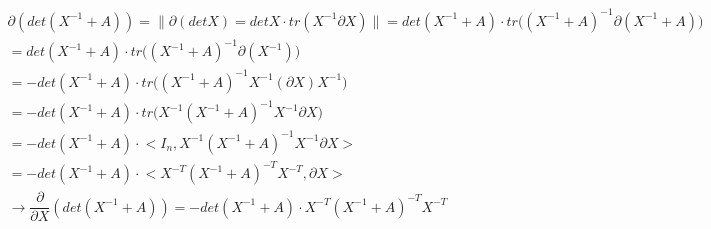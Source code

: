\begin{gather*}
\partial (det(X^{-1}+A)) = \bigg\| \partial(detX) = detX \cdot tr(X^{-1}\partial X) \bigg\| = det(X^{-1}+A) \cdot tr\big( (X^{-1}+A)^{-1}  \partial (X^{-1} + A) \big) \\ = det(X^{-1}+A) \cdot tr\big( (X^{-1}+A)^{-1}  \partial (X^{-1}) \big)
\\ = - det(X^{-1}+A) \cdot tr\big( (X^{-1}+A)^{-1}  X^{-1} (\partial X) X^{-1} \big)
\\ = - det(X^{-1}+A) \cdot tr\big( X^{-1} (X^{-1}+A)^{-1} X^{-1} \partial X \big)
\\ = - det(X^{-1}+A) \cdot \big<I_n, X^{-1} (X^{-1}+A)^{-1} X^{-1} \partial X \big>
\\ = - det(X^{-1}+A) \cdot \big<X^{-T} (X^{-1}+A)^{-T} X^{-T},  \partial X \big>
\\ \rightarrow \dfrac{\partial}{\partial X} (det(X^{-1}+A)) = - det(X^{-1}+A) \cdot X^{-T} (X^{-1}+A)^{-T} X^{-T}
\end{gather*}